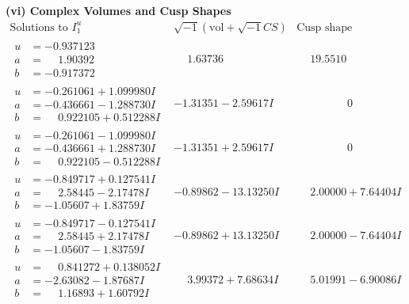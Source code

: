 \documentclass[1p]{elsarticle_modified}
\theoremstyle{definition}
\newcommand{\I}{\sqrt{-1}}
\begin{document}
\newpage\flushleft \textbf{(vi) Complex Volumes and Cusp Shapes}
$$\begin{array}{c|c|c}  
\text{Solutions to }I^u_{1}& \I (\text{vol} + \sqrt{-1}CS) & \text{Cusp shape}\\
 \hline 
\begin{aligned}
u &= -0.937123\phantom{ +0.000000I} \\
a &= \phantom{-}1.90392\phantom{ +0.000000I} \\
b &= -0.917372\phantom{ +0.000000I}\end{aligned}
 & \phantom{-}1.63736\phantom{ +0.000000I} & \phantom{-}19.5510\phantom{ +0.000000I} \\ \hline\begin{aligned}
u &= -0.261061 + 1.099980 I \\
a &= -0.436661 - 1.288730 I \\
b &= \phantom{-}0.922105 + 0.512288 I\end{aligned}
 & -1.31351 - 2.59617 I & \phantom{-0.000000 } 0 \\ \hline\begin{aligned}
u &= -0.261061 - 1.099980 I \\
a &= -0.436661 + 1.288730 I \\
b &= \phantom{-}0.922105 - 0.512288 I\end{aligned}
 & -1.31351 + 2.59617 I & \phantom{-0.000000 } 0 \\ \hline\begin{aligned}
u &= -0.849717 + 0.127541 I \\
a &= \phantom{-}2.58445 - 2.17478 I \\
b &= -1.05607 + 1.83759 I\end{aligned}
 & -0.89862 - 13.13250 I & \phantom{-}2.00000 + 7.64404 I \\ \hline\begin{aligned}
u &= -0.849717 - 0.127541 I \\
a &= \phantom{-}2.58445 + 2.17478 I \\
b &= -1.05607 - 1.83759 I\end{aligned}
 & -0.89862 + 13.13250 I & \phantom{-}2.00000 - 7.64404 I \\ \hline\begin{aligned}
u &= \phantom{-}0.841272 + 0.138052 I \\
a &= -2.63082 - 1.87687 I \\
b &= \phantom{-}1.16893 + 1.60792 I\end{aligned}
 & \phantom{-}3.99372 + 7.68634 I & \phantom{-}5.01991 - 6.90086 I \\ \hline\begin{aligned}

\end{aligned}
\end{array}$$
\end{document}
